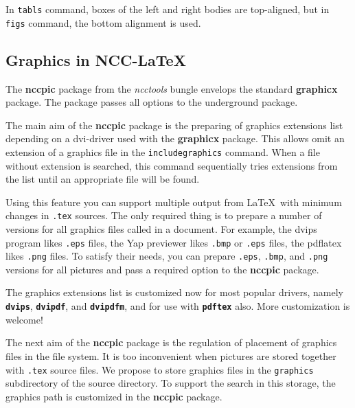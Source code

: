 \documentclass[11pt]{ncc}
\newcommand*\package[1]{\textbf{#1}}
\newcommand*\bungle[1]{\textit{#1}}
\newcommand*\Opt[1]{\texttt{\textbf{#1}}}
\newcommand*\Meta[1]{\texttt{\upshape#1}}
\newcommand*\com[1]{\Meta{\symbol{"5C}#1}}
\begin{document}
In \com{tabls} command, boxes of the left and right bodies are
top-aligned, but in \com{figs} command, the bottom alignment is
used.

\subsection{Graphics in NCC-\LaTeX{}}

The \package{nccpic} package from the \bungle{ncctools} bungle
envelops the standard \package{graphicx} package. The package
passes all options to the underground package.

The main aim of the \package{nccpic} package is the preparing of
graphics extensions list depending on a dvi-driver used with the
\package{graphicx} package. This allows omit an extension of a
graphics file in the \com{includegraphics} command. When a file
without extension is searched, this command sequentially tries
extensions from the list until an appropriate file will be found.

Using this feature you can support multiple output from \LaTeX\
with minimum changes in \Meta{.tex} sources. The only required
thing is to prepare a number of versions for all graphics files
called in a document. For example, the dvips program likes
\Meta{.eps} files, the Yap previewer likes \Meta{.bmp} or
\Meta{.eps} files, the pdflatex likes \Meta{.png} files. To
satisfy their needs, you can prepare \Meta{.eps}, \Meta{.bmp},
and \Meta{.png} versions for all pictures and pass a required
option to the \package{nccpic} package.

The graphics extensions list is customized now for most popular
drivers, namely \Opt{dvips}, \Opt{dvipdf}, and \Opt{dvipdfm}, and
for use with \Opt{pdftex} also. More customization is welcome!

The next aim of the \package{nccpic} package is the regulation of
placement of graphics files in the file system. It is too
inconvenient when pictures are stored together with \Meta{.tex}
source files. We propose to store graphics files in the
\Meta{graphics} subdirectory of the source directory. To support
the search in this storage, the graphics path is customized in the
\package{nccpic} package.
\end{document}
